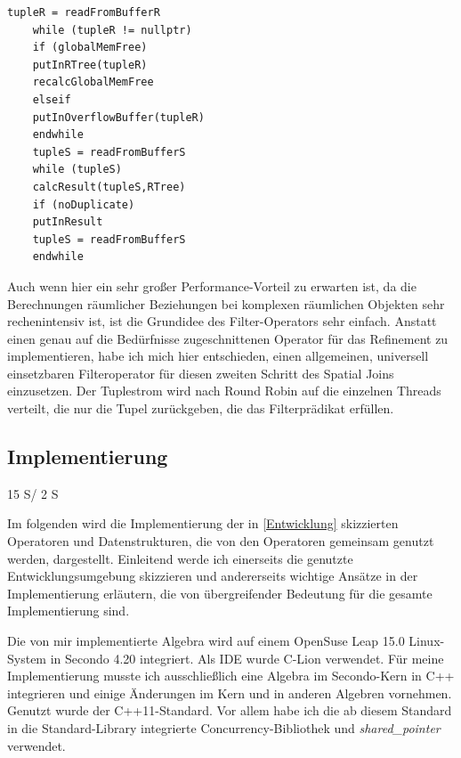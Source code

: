 \documentclass[a4paper,12pt,twoside]{article}
\newcommand{\Fb}[1]{\textit{#1}} %
\begin{document}
\begin{minipage}{\linewidth}
	\begin{lstlisting}[caption={Spatial Join: Worker}, label=list:spatialJoin]
	tupleR = readFromBufferR 
	while (tupleR != nullptr)
	if (globalMemFree)
	putInRTree(tupleR)
	recalcGlobalMemFree
	elseif
	putInOverflowBuffer(tupleR)
	endwhile
	tupleS = readFromBufferS
	while (tupleS)
	calcResult(tupleS,RTree)
	if (noDuplicate)
	putInResult
	tupleS = readFromBufferS
	endwhile
	\end{lstlisting}
\end{minipage}

Auch wenn hier ein sehr großer Performance-Vorteil zu erwarten ist, da die Berechnungen räumlicher Beziehungen bei komplexen räumlichen Objekten sehr rechenintensiv ist, ist die Grundidee des Filter-Operators sehr einfach. Anstatt einen genau auf die Bedürfnisse zugeschnittenen Operator für das Refinement zu implementieren, habe ich mich hier entschieden, einen allgemeinen, universell einsetzbaren Filteroperator für diesen zweiten Schritt des Spatial Joins einzusetzen. Der Tuplestrom wird nach Round Robin auf die einzelnen Threads verteilt, die nur die Tupel zurückgeben, die das Filterprädikat erfüllen.

\subsection{Implementierung} 15 S/ 2 S
\label{Implemeniterung} 

Im folgenden wird die Implementierung der in \autoref{Entwicklung} skizzierten Operatoren und Datenstrukturen, die von den Operatoren gemeinsam genutzt werden, dargestellt. Einleitend werde ich einerseits die genutzte Entwicklungsumgebung skizzieren und andererseits wichtige Ansätze in der Implementierung erläutern, die von übergreifender Bedeutung für die gesamte Implementierung sind.

Die von mir implementierte Algebra wird auf einem OpenSuse Leap 15.0 Linux-System in Secondo 4.20 integriert. Als IDE wurde C-Lion verwendet. Für meine Implementierung musste ich ausschließlich eine Algebra im Secondo-Kern in C++ integrieren und einige Änderungen im Kern und in anderen Algebren vornehmen. Genutzt wurde der C++11-Standard. Vor allem habe ich die ab diesem Standard in die Standard-Library integrierte Concurrency-Bibliothek und \Fb{shared\_pointer} verwendet.
\end{document}
